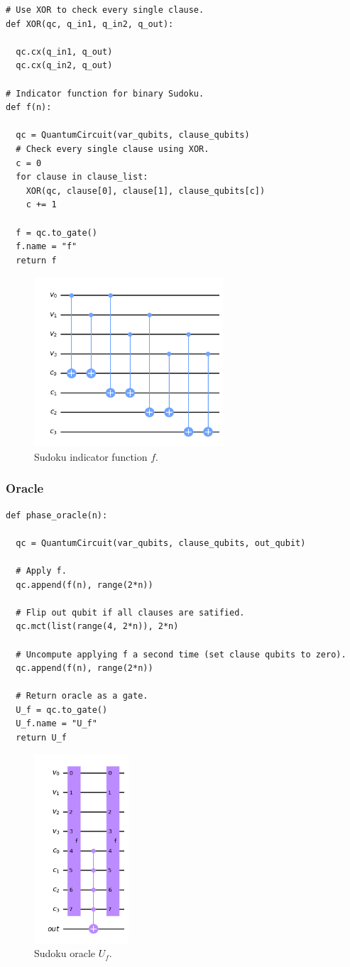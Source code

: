 \documentclass{article}
\begin{document}
\begin{verbatim}
# Use XOR to check every single clause.
def XOR(qc, q_in1, q_in2, q_out):

  qc.cx(q_in1, q_out)
  qc.cx(q_in2, q_out)

# Indicator function for binary Sudoku.
def f(n):

  qc = QuantumCircuit(var_qubits, clause_qubits)
  # Check every single clause using XOR.
  c = 0
  for clause in clause_list:
    XOR(qc, clause[0], clause[1], clause_qubits[c])
    c += 1

  f = qc.to_gate()
  f.name = "f"
  return f
\end{verbatim}
\begin{figure}[H]
  \centering
  \includegraphics[width=200pt]{Img/f-circuit.png}
  \caption{Sudoku indicator function $f$.}
\end{figure}

\subsubsection{Oracle}
\begin{verbatim}
def phase_oracle(n):

  qc = QuantumCircuit(var_qubits, clause_qubits, out_qubit)

  # Apply f.
  qc.append(f(n), range(2*n))

  # Flip out qubit if all clauses are satified.
  qc.mct(list(range(4, 2*n)), 2*n)

  # Uncompute applying f a second time (set clause qubits to zero).
  qc.append(f(n), range(2*n))

  # Return oracle as a gate.
  U_f = qc.to_gate()
  U_f.name = "U_f"
  return U_f
\end{verbatim}
\begin{figure}[H]
  \centering
  \includegraphics[width=100pt]{Img/uf-circuit.png}
  \caption{Sudoku oracle $U_f$.}
\end{figure}
\end{document}
